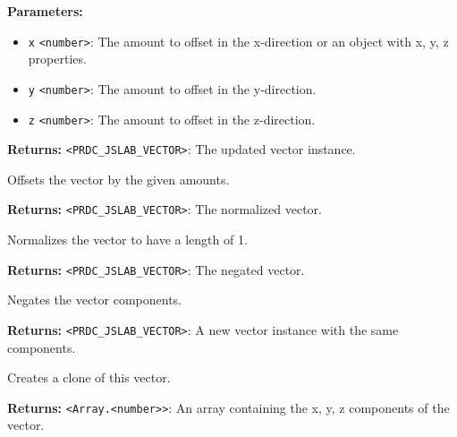 \documentclass[12pt,a4paper]{article}
\begin{document}
\noindent \textbf{Parameters:}
\begin{itemize}
  \item \texttt{x} \texttt{<number>}: The amount to offset in the x-direction or an object with x, y, z properties.
  \item \texttt{y} \texttt{<number>}: The amount to offset in the y-direction.
  \item \texttt{z} \texttt{<number>}: The amount to offset in the z-direction.
\end{itemize}

\noindent \textbf{Returns:} \texttt{<PRDC\_JSLAB\_VECTOR>}: The updated vector instance.

\noindent Offsets the vector by the given amounts.

\vspace{5mm}
\noindent {}


\noindent \textbf{Returns:} \texttt{<PRDC\_JSLAB\_VECTOR>}: The normalized vector.

\noindent Normalizes the vector to have a length of 1.

\vspace{5mm}
\noindent {}


\noindent \textbf{Returns:} \texttt{<PRDC\_JSLAB\_VECTOR>}: The negated vector.

\noindent Negates the vector components.

\vspace{5mm}
\noindent {}


\noindent \textbf{Returns:} \texttt{<PRDC\_JSLAB\_VECTOR>}: A new vector instance with the same components.

\noindent Creates a clone of this vector.

\vspace{5mm}
\noindent {}


\noindent \textbf{Returns:} \texttt{<Array.<number>>}: An array containing the x, y, z components of the vector.
\end{document}
